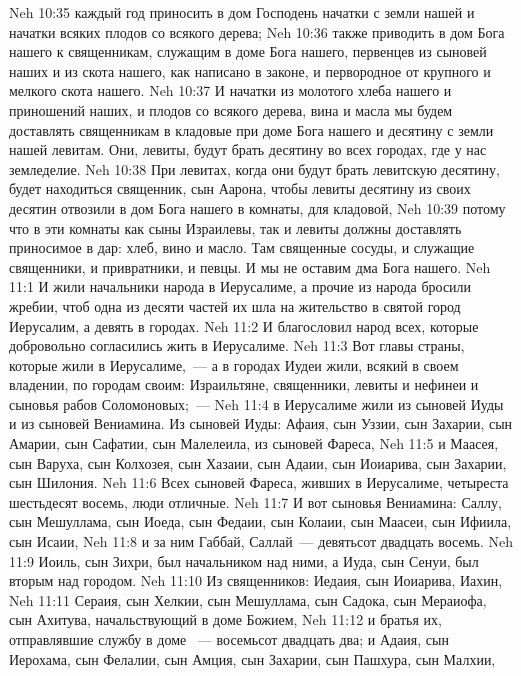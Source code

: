 \vs Neh 10:35  каждый год приносить в дом Господень начатки с земли нашей и начатки всяких плодов со всякого дерева;
\vs Neh 10:36 также приводить в дом Бога нашего к священникам, служащим в доме Бога нашего, первенцев из сыновей наших и из скота нашего, как написано в законе, и первородное от крупного и мелкого скота нашего.
\vs Neh 10:37 И начатки из молотого хлеба нашего и приношений наших, и плодов со всякого дерева, вина и масла мы будем доставлять священникам в кладовые при доме Бога нашего и десятину с земли нашей левитам. Они, левиты, будут брать десятину во всех городах, где у нас земледелие.
\vs Neh 10:38 При левитах, когда они будут брать левитскую десятину, будет находиться священник, сын Аарона, чтобы левиты десятину из своих десятин отвозили в дом Бога нашего в комнаты,  для кладовой,
\vs Neh 10:39 потому что в эти комнаты как сыны Израилевы, так и левиты должны доставлять приносимое в дар: хлеб, вино и масло. Там священные сосуды, и служащие священники, и привратники, и певцы. И мы не оставим дма Бога нашего.
\vs Neh 11:1 И жили начальники народа в Иерусалиме, а прочие из народа бросили жребии, чтоб одна из десяти частей их шла на жительство в святой город Иерусалим, а девять  в  городах.
\rsbpar\vs Neh 11:2 И благословил народ всех, которые добровольно согласились жить в Иерусалиме.
\vs Neh 11:3 Вот главы страны, которые жили в Иерусалиме,~--- а в городах Иудеи жили, всякий в своем владении, по городам своим: Израильтяне, священники, левиты и нефинеи и сыновья рабов Соломоновых;~---
\vs Neh 11:4 в Иерусалиме жили из сыновей Иуды и из сыновей Вениамина. Из сыновей Иуды: Афаия, сын Уззии, сын Захарии, сын Амарии, сын Сафатии, сын Малелеила, из сыновей Фареса,
\vs Neh 11:5 и Маасея, сын Варуха, сын Колхозея, сын Хазаии, сын Адаии, сын Иоиарива, сын Захарии, сын Шилония.
\vs Neh 11:6 Всех сыновей Фареса, живших в Иерусалиме, четыреста шестьдесят восемь, люди отличные.
\vs Neh 11:7 И вот сыновья Вениамина: Саллу, сын Мешуллама, сын Иоеда, сын Федаии, сын Колаии, сын Маасеи, сын Ифиила, сын Исаии,
\vs Neh 11:8 и за ним Габбай, Саллай~--- девятьсот двадцать восемь.
\vs Neh 11:9 Иоиль, сын Зихри, был начальником над ними, а Иуда, сын Сенуи, был вторым над городом.
\vs Neh 11:10 Из священников: Иедаия, сын Иоиарива, Иахин,
\vs Neh 11:11 Сераия, сын Хелкии, сын Мешуллама, сын Садока, сын Мераиофа, сын Ахитува, начальствующий в доме Божием,
\vs Neh 11:12 и братья их, отправлявшие службу в доме ~--- восемьсот двадцать два; и Адаия, сын Иерохама, сын Фелалии, сын Амция, сын Захарии, сын Пашхура, сын Малхии,
